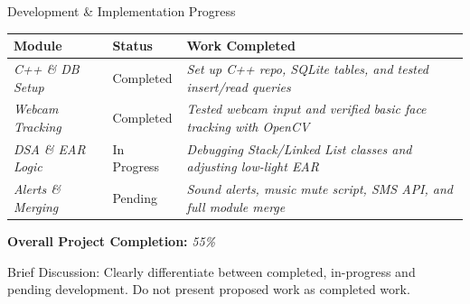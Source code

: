 \documentclass[aspectratio=169,11pt]{beamer}
\newcommand{\smallnote}[1]{%
\vspace{0.08cm}
{\scriptsize\color{GEUGrey}#1}
}
\newcommand{\placeholder}[1]{%
\textit{\color{GEUGrey}#1}
}
\begin{document}
\begin{frame}{Development \& Implementation Progress}

\scriptsize

\begin{center}

\renewcommand{\arraystretch}{1.25}

\begin{tabularx}{.96\textwidth}
{@{}p{3cm}p{2.2cm}X@{}}

\toprule
\textbf{Module} &
\textbf{Status} &
\textbf{Work Completed}\\
\midrule

\placeholder{C++ \& DB Setup} &
Completed &
\placeholder{Set up C++ repo, SQLite tables, and tested insert/read queries}\\

\placeholder{Webcam Tracking} &
Completed &
\placeholder{Tested webcam input and verified basic face tracking with OpenCV}\\

\placeholder{DSA \& EAR Logic} &
In Progress &
\placeholder{Debugging Stack/Linked List classes and adjusting low-light EAR}\\

\placeholder{Alerts \& Merging} &
Pending &
\placeholder{Sound alerts, music mute script, SMS API, and full module merge}\\

\bottomrule

\end{tabularx}

\end{center}

\vspace{3mm}

\begin{center}
\colorbox{GEULightBlue}{
\parbox{.65\textwidth}{
\centering
\textbf{Overall Project Completion:}
\placeholder{55\%}
}}
\end{center}

\vfill

\smallnote{
Brief Discussion: Clearly differentiate between completed,
in-progress and pending development. Do not present proposed work
as completed work.
}

\end{frame}
\end{document}
